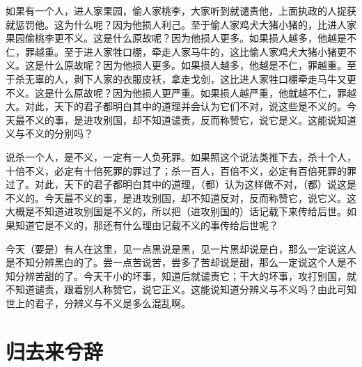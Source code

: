 \documentclass[12pt,UTF-8,openany]{ctexbook}
\begin{document}
\begin{normalsize}
    
    如果有一个人，进人家果园，偷人家桃李，大家听到就谴责他，上面执政的人捉获就惩罚他。这为什么呢？因为他损人利己。至于偷人家鸡犬大猪小猪的，比进人家果园偷桃李更不义。这是什么原故呢？因为他损人更多。如果损人越多，他越是不仁，罪越重。至于进人家牲口棚，牵走人家马牛的，这比偷人家鸡犬大猪小猪更不义。这是什么原故呢？因为他损人更多。如果损人越多，他越是不仁，罪越重。至于杀无辜的人，剥下人家的衣服皮袄，拿走戈剑，这比进人家牲口棚牵走马牛又更不义。这是什么原故呢？因为他损人更严重。如果损人越严重，他就越不仁，罪越大。对此，天下的君子都明白其中的道理并会认为它们不对，说这些是不义的。今天最不义的事，是进攻别国，却不知道谴责，反而称赞它，说它是义。这能说知道义与不义的分别吗？
    
    说杀一个人，是不义，一定有一人负死罪。如果照这个说法类推下去，杀十个人，十倍不义，必定有十倍死罪的罪过了；杀一百人，百倍不义，必定有百倍死罪的罪过了。对此，天下的君子都明白其中的道理，（都）认为这样做不对，（都）说这是不义的。今天最不义的事，是进攻别国，却不知道反对，反而称赞它，说它义。这大概是不知道进攻别国是不义的，所以把（进攻别国的）话记载下来传给后世。如果知道它是不义的，那还有什么理由记载不义的事传给后世呢？
    
    今天（要是）有人在这里，见一点黑说是黑，见一片黑却说是白，那么一定说这人是不知分辨黑白的了。尝一点苦说苦，尝多了苦却说是甜，那么一定说这个人是不知分辨苦甜的了。今天干小的坏事，知道后就谴责它；干大的坏事，攻打别国，就不知道谴责，跟着别人称赞它，说它正义。这能说知道分辨义与不义吗？由此可知世上的君子，分辨义与不义是多么混乱啊。
    
\end{normalsize}



\chapter{归去来兮辞}
\end{document}
